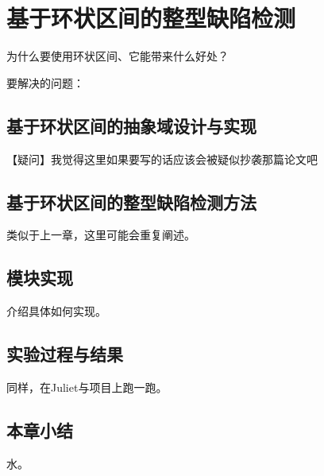 
\chapter{基于环状区间的整型缺陷检测}

为什么要使用环状区间、它能带来什么好处？

要解决的问题：

\section{基于环状区间的抽象域设计与实现}

【疑问】我觉得这里如果要写的话应该会被疑似抄袭那篇论文吧

\section{基于环状区间的整型缺陷检测方法}

类似于上一章，这里可能会重复阐述。

\section{模块实现}

介绍具体如何实现。

\section{实验过程与结果}

同样，在Juliet与项目上跑一跑。

\section{本章小结}

水。